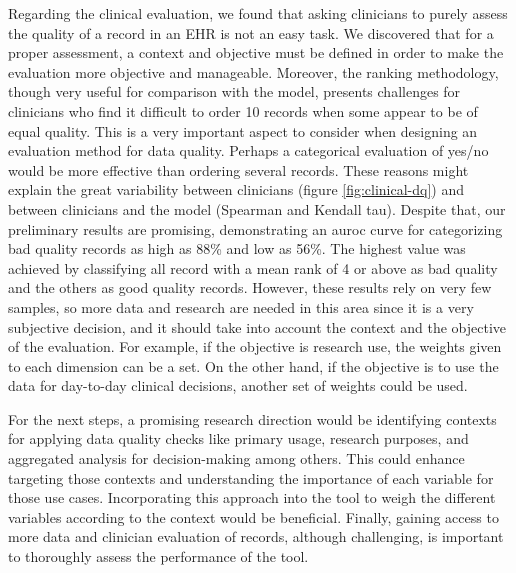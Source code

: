 Regarding the clinical evaluation, we found that asking clinicians to purely assess the quality of a record in an EHR is not an easy task. We discovered that for a proper assessment, a context and objective must be defined in order to make the evaluation more objective and manageable. Moreover, the ranking methodology, though very useful for comparison with the model, presents challenges for clinicians who find it difficult to order 10 records when some appear to be of equal quality. This is a very important aspect to consider when designing an evaluation method for data quality. Perhaps a categorical evaluation of yes/no would be more effective than ordering several records. These reasons might explain the great variability between clinicians (figure \ref{fig:clinical-dq}) and between clinicians and the model (Spearman and Kendall tau). Despite that, our preliminary results are promising, demonstrating an \ac{auroc} curve for categorizing bad quality records as high as 88\% and low as 56\%. The highest value was achieved by classifying all record with a mean rank of 4 or above as bad quality and the others as good quality records. However, these results rely on very few samples, so more data and research are needed in this area since it is a very subjective decision, and it should take into account the context and the objective of the evaluation. For example, if the objective is research use, the weights given to each dimension can be a set. On the other hand, if the objective is to use the data for day-to-day clinical decisions, another set of weights could be used. 

For the next steps, a promising research direction would be identifying contexts for applying data quality checks like primary usage, research purposes, and aggregated analysis for decision-making among others. This could enhance targeting those contexts and understanding the importance of each variable for those use cases. Incorporating this approach into the tool to weigh the different variables according to the context would be beneficial.  Finally, gaining access to more data and clinician evaluation of records, although challenging, is important to thoroughly assess the performance of the tool.

